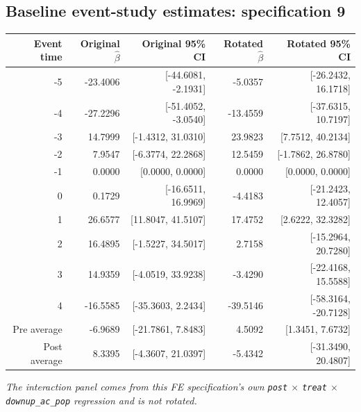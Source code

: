 \documentclass[10pt]{article}
\begin{document}
\subsection*{Baseline event-study estimates: specification 9}
\begin{center}
\scriptsize
\begin{tabular}{r rr rr}
\toprule
Event time & Original $\hat\beta$ & Original 95\% CI & Rotated $\hat\beta$ & Rotated 95\% CI \\
\midrule
-5 & -23.4006 & [-44.6081, -2.1931] & -5.0357 & [-26.2432, 16.1718] \\
-4 & -27.2296 & [-51.4052, -3.0540] & -13.4559 & [-37.6315, 10.7197] \\
-3 & 14.7999 & [-1.4312, 31.0310] & 23.9823 & [7.7512, 40.2134] \\
-2 & 7.9547 & [-6.3774, 22.2868] & 12.5459 & [-1.7862, 26.8780] \\
-1 & 0.0000 & [0.0000, 0.0000] & 0.0000 & [0.0000, 0.0000] \\
0 & 0.1729 & [-16.6511, 16.9969] & -4.4183 & [-21.2423, 12.4057] \\
1 & 26.6577 & [11.8047, 41.5107] & 17.4752 & [2.6222, 32.3282] \\
2 & 16.4895 & [-1.5227, 34.5017] & 2.7158 & [-15.2964, 20.7280] \\
3 & 14.9359 & [-4.0519, 33.9238] & -3.4290 & [-22.4168, 15.5588] \\
4 & -16.5585 & [-35.3603, 2.2434] & -39.5146 & [-58.3164, -20.7128] \\
\midrule
Pre average & -6.9689 & [-21.7861, 7.8483] & 4.5092 & [1.3451, 7.6732] \\
Post average & 8.3395 & [-4.3607, 21.0397] & -5.4342 & [-31.3490, 20.4807] \\
\bottomrule
\end{tabular}
\end{center}
\medskip
\textit{The interaction panel comes from this FE specification's own \texttt{post} $\times$ \texttt{treat} $\times$ \texttt{downup\_ac\_pop} regression and is not rotated.}
\clearpage
\end{document}

